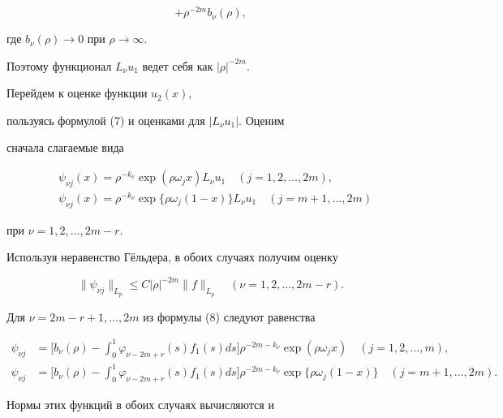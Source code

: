 \begin{pf}
\begin{equation}
+\rho^{-2m}b_\nu(\rho), 


\end{equation} 


где $b_\nu(\rho)\to 0$ при $\rho\to\infty$. 


Поэтому функционал $L_\nu u_1$ ведет себя как $|\rho|^{-2m}$. 


 


Перейдем к оценке функции $u_2(x)$, 


пользуясь формулой (7) и оценками для $|L_\nu u_1|$. Оценим 


сначала слагаемые вида 


\begin{align*} 


& \psi_{\nu j}(x) =\rho^{-k_\nu}\exp(\rho\omega_jx)L_\nu u_1 


\quad (j=1,2,\dotsc,2m),\\ 


& \psi_{\nu j}(x) =\rho^{-k_\nu}\exp\{\rho\omega_j(1-x)\}L_\nu u_1 


\quad (j=m+1,\dotsc,2m)


\end{align*} 


при $\nu=1,2,\dotsc,2m-r$. 


Используя неравенство Г\"ельдера, в обоих случаях получим оценку 


$$ 


\|\psi_{\nu j}\|_{L_p} \le C|\rho|^{-2m}\|f\|_{L_p} \quad 


(\nu=1,2,\dotsc,2m-r). 


$$ 


Для $\nu=2m-r+1,\dotsc,2m$ из формулы (8) следуют равенства 


\begin{align*} 


\psi_{\nu j} & =\biggl[b_\nu(\rho)-\int^1_0\varphi_{\nu-2m+r}(s) 


f_1(s)ds\biggr]\rho^{-2m-k_\nu}\exp(\rho\omega_j x) 


\quad (j=1,2,\dotsc,m),\\ 


\psi_{\nu j} & =\biggl[b_\nu(\rho)-\int^1_0\varphi_{\nu-2m+r}(s) 


f_1(s)ds\biggr]\rho^{-2m-k_\nu}\exp\{\rho\omega_j(1-x)\} 


\quad (j=m+1,\dotsc,2m). 


\end{align*} 


Нормы этих функций в обоих случаях вычисляются и 



\end{pf}
